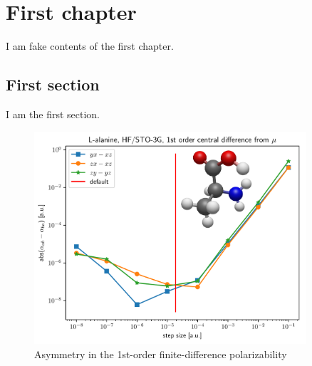 \newcommand{\op}[1]{\ensuremath{\hat{#1}}}
\newcommand{\lr}[2]{\braket{\braket{\op{#1}; \op{#2}}}}
\newcommand{\mat}[1]{\ensuremath{\mathbf{#1}}}
\newcommand\qchem{\textsc{Q-Chem}}

\chapter{First chapter}

I am fake contents of the first chapter.

\section{First section}

I am the first section.

\begin{figure}
  \centering
  \includegraphics[width=0.90\textwidth]{./diff_overlay.pdf}
  \caption{Asymmetry in the 1st-order finite-difference polarizability\label{fig:finite-difference-numerical-noise}}
\end{figure}

